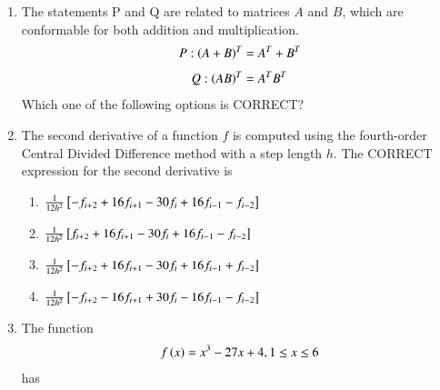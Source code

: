 \documentclass[journal,12pt,onecolumn]{article}
\theoremstyle{remark}
\begin{document}
\begin{enumerate}
    \item The statements P and Q are related to matrices $A$ and $B$, which are conformable for
    both addition and multiplication.
    \begin{align}
    P: \left(A + B\right)^T = A^T + B^T
     \end{align}
     \begin{align}
    Q: \left(AB\right)^T = A^T B^T
    \end{align}
    Which one of the following options is CORRECT?
    
    \hfill{}
    \begin{enumerate}
    \end{enumerate}
    
    \item The second derivative of a function $f$ is computed using the fourth-order Central
    Divided Difference method with a step length $h$.
    The CORRECT expression for the second derivative is
    
    \hfill{}
    \begin{enumerate}
        \item $\frac{1}{12h^2} {}\left[-f_{i+2} + 16 f_{i+1} - 30 f_i + 16 f_{i-1} - f_{i-2}\right]$
        \item $\frac{1}{12h^2} {}\left[f_{i+2} + 16 f_{i+1} - 30 f_i + 16 f_{i-1} - f_{i-2}\right]$
        \item $\frac{1}{12h^2} {}\left[-f_{i+2} + 16 f_{i+1} - 30 f_i + 16 f_{i-1} + f_{i-2}\right]$
        \item $\frac{1}{12h^2} {}\left[-f_{i+2} - 16 f_{i+1} + 30 f_i - 16 f_{i-1} - f_{i-2}\right]$
    \end{enumerate}

    \item The function 
    \begin{align}
    f\left(x\right) = x^3 - 27x + 4, 1 \leq x \leq 6
    \end{align}
    has
    
    \hfill{}
    \begin{enumerate}
    \end{enumerate}


\end{enumerate}
\end{document}
